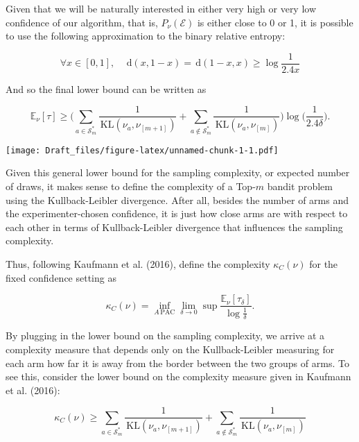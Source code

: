 \documentclass[12pt,]{article}
\newcommand{\KL}{\,\text{KL}}
\newcommand{\der}{\,\text{d}}
\begin{document}
Given that we will be naturally interested in either very high or very
low confidence of our algorithm, that is, \(P_\nu(\mathcal{E})\) is
either close to 0 or 1, it is possible to use the following
approximation to the binary relative entropy:

\begin{equation}\label{bre_approx}
\forall x \in [0,1], \quad \der(x,1-x) = \der(1-x,x) \geq \log \frac{1}{2.4x}
\end{equation}

And so the final lower bound can be written as

\begin{equation*}
\mathbb{E}_{\nu}[\tau] \geq \Big( \sum_{a \in \mathcal{S}_m^*} \frac{1}{\KL(\nu_a, \nu_{[m+1]})} + \sum_{a \notin \mathcal{S}_m^*} \frac{1}{\KL(\nu_a, \nu_{[m]})} \Big) \log \big(\frac{1}{2.4\delta} \big).
\end{equation*}

\texttt{[image: Draft\_files/figure-latex/unnamed-chunk-1-1.pdf]}

Given this general lower bound for the sampling complexity, or expected
number of draws, it makes sense to define the complexity of a Top-\(m\)
bandit problem using the Kullback-Leibler divergence. After all, besides
the number of arms and the experimenter-chosen confidence, it is just
how close arms are with respect to each other in terms of
Kullback-Leibler divergence that influences the sampling complexity.

Thus, following Kaufmann et al. (2016), define the complexity
\(\kappa_C(\nu)\) for the fixed confidence setting as

\begin{equation}
\kappa_C(\nu) = \inf_{A \, \text{PAC}} \lim_{\delta \to 0} \sup \frac{\mathbb{E}_{\nu}[\tau_{\delta}]}{\log \frac{1}{\delta}}.
\end{equation}

By plugging in the lower bound on the sampling complexity, we arrive at
a complexity measure that depends only on the Kullback-Leibler measuring
for each arm how far it is away from the border between the two groups
of arms. To see this, consider the lower bound on the complexity measure
given in Kaufmann et al. (2016):

\begin{equation*}
\kappa_C(\nu) \geq \sum_{a \in \mathcal{S}_m^*} \frac{1}{\KL(\nu_a, \nu_{[m+1]})} + \sum_{a \notin \mathcal{S}_m^*} \frac{1}{\KL(\nu_a, \nu_{[m]})}
\end{equation*}
\end{document}
